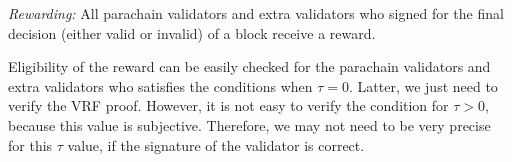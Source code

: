 \emph{Rewarding:} All parachain validators and extra validators who signed for the final decision (either valid or invalid) of a block receive a reward. 

Eligibility of the reward can be easily checked for the parachain validators and extra validators who satisfies the conditions when $\tau = 0$. Latter, we just need to verify the VRF proof.
However, it is not easy to verify the condition for $\tau > 0$, because this value is subjective. Therefore, we may not need to be very precise for this $\tau$ value, if the signature of the validator is correct.
